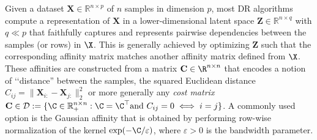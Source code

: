Given a dataset $\mathbf{X} \in \mathbb{R}^{n \times p}$ of $n$ samples in dimension $p$, most DR algorithms compute a representation of $\mathbf{X}$ in a lower-dimensional latent space $\mathbf{Z} \in \mathbb{R}^{n \times q}$ with $q \ll p$ that faithfully captures and represents pairwise dependencies between the samples (or rows) in $\X$. This is generally achieved by optimizing $\mathbf{Z}$ such that the corresponding affinity matrix matches another affinity matrix defined from $\X$. These affinities are constructed from a matrix $\mathbf{C} \in \R^{n \times n}$ that encodes a notion of ‘‘distance'' between the samples, \eg the squared Euclidean distance $C_{ij} = \|\mathbf{X}_{i:}-\mathbf{X}_{j:}\|_2^2$ or more generally any \emph{cost matrix} $\mathbf{C} \in \mathcal{D} := \{\C \in \mathbb{R}_+^{n \times n} : \C = \C^\top \text{and } C_{ij}=0 \iff i=j\}$. A commonly used option is the Gaussian affinity that is obtained by performing row-wise normalization of the kernel $\exp(-\C / \varepsilon)$, where $\varepsilon >0$ is the bandwidth parameter.

